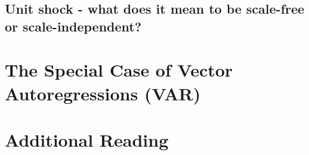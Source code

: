 \documentclass[11pt]{article}
\theoremstyle{definition}
\begin{document}
\subsection{Unit shock - what does it mean to be scale-free or scale-independent?}

\section{The Special Case of Vector Autoregressions (VAR)}

\section{Additional Reading}

\citet{lutkepohl2020structural}

\citet{chudik2022estimation}

\citet{wilms2017interpretable}



  
\end{document}
